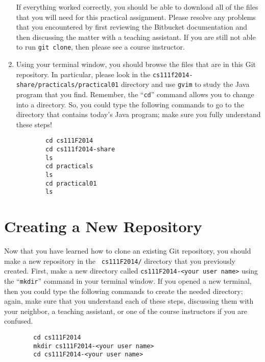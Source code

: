 \begin{enumerate}
    If everything worked correctly, you should be able to download all of the files that you will need for this
    practical assignment. Please resolve any problems that you encountered by first reviewing the Bitbucket
    documentation and then discussing the matter with a teaching assistant.  If you are still not able to run {\tt git
      clone}, then please see a course instructor.

  \item Using your terminal window, you should browse the files that are in this Git repository.  In particular, please
    look in the {\tt cs111f2014-share/practicals/practical01} directory and use {\tt gvim} to study the Java program that
    you find.  Remember, the ``{\tt cd}'' command allows you to change into a directory. So, you could type the following
    commands to go to the directory that contains today's Java program; make sure you fully understand these steps!

    \vspace*{-.1in}
    \begin{verbatim}
        cd cs111F2014
        cd cs111f2014-share
        ls
        cd practicals
        ls
        cd practical01
        ls
    \end{verbatim}
    \vspace*{-.5in}

    \end{enumerate}

\section*{Creating a New Repository}

Now that you have learned how to clone an existing Git repository, you should make a new repository in the {\tt
  cs111F2014/} directory that you previously created.  First, make a new directory called {\tt cs111F2014-<your user
  name>} using the ``{\tt mkdir}'' command in your terminal window. If you opened a new terminal, then you could type
the following commands to create the needed directory; again, make sure that you understand each of these steps,
discussing them with your neighbor, a teaching assistant, or one of the course instructors if you are confused.

    \vspace*{-.1in}
    \begin{verbatim}
        cd cs111F2014
        mkdir cs111F2014-<your user name>
        cd cs111F2014-<your user name>
    \end{verbatim}
    \vspace*{-.1in}

